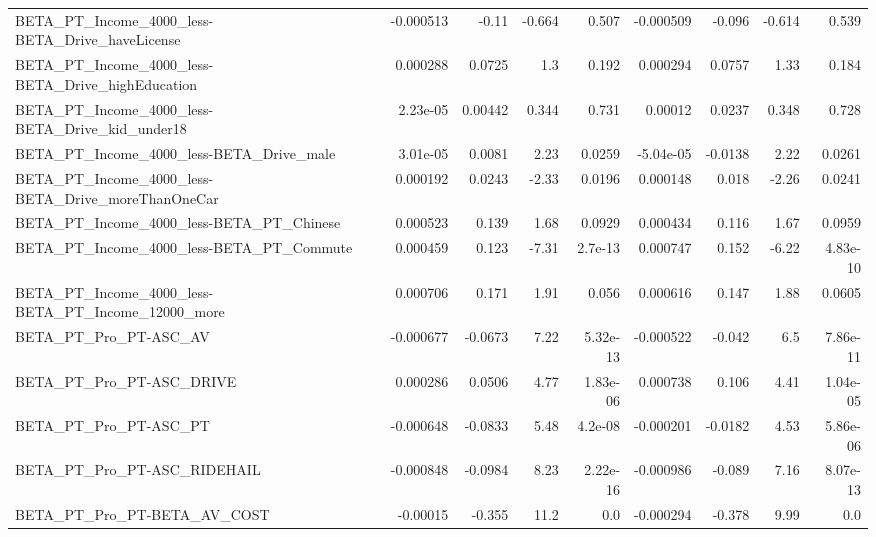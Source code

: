 \begin{tabular}{lrrrrrrrr}
BETA\_PT\_Income\_4000\_less-BETA\_Drive\_haveLicense    &   -0.000513 &        -0.11 &    -0.664 &    0.507 &  -0.000509 &      -0.096 &       -0.614 &         0.539 \\
BETA\_PT\_Income\_4000\_less-BETA\_Drive\_highEducation  &    0.000288 &       0.0725 &       1.3 &    0.192 &   0.000294 &      0.0757 &         1.33 &         0.184 \\
BETA\_PT\_Income\_4000\_less-BETA\_Drive\_kid\_under18    &    2.23e-05 &      0.00442 &     0.344 &    0.731 &    0.00012 &      0.0237 &        0.348 &         0.728 \\
BETA\_PT\_Income\_4000\_less-BETA\_Drive\_male           &    3.01e-05 &       0.0081 &      2.23 &   0.0259 &  -5.04e-05 &     -0.0138 &         2.22 &        0.0261 \\
BETA\_PT\_Income\_4000\_less-BETA\_Drive\_moreThanOneCar &    0.000192 &       0.0243 &     -2.33 &   0.0196 &   0.000148 &       0.018 &        -2.26 &        0.0241 \\
BETA\_PT\_Income\_4000\_less-BETA\_PT\_Chinese           &    0.000523 &        0.139 &      1.68 &   0.0929 &   0.000434 &       0.116 &         1.67 &        0.0959 \\
BETA\_PT\_Income\_4000\_less-BETA\_PT\_Commute           &    0.000459 &        0.123 &     -7.31 &  2.7e-13 &   0.000747 &       0.152 &        -6.22 &      4.83e-10 \\
BETA\_PT\_Income\_4000\_less-BETA\_PT\_Income\_12000\_more &    0.000706 &        0.171 &      1.91 &    0.056 &   0.000616 &       0.147 &         1.88 &        0.0605 \\
BETA\_PT\_Pro\_PT-ASC\_AV                              &   -0.000677 &      -0.0673 &      7.22 & 5.32e-13 &  -0.000522 &      -0.042 &          6.5 &      7.86e-11 \\
BETA\_PT\_Pro\_PT-ASC\_DRIVE                           &    0.000286 &       0.0506 &      4.77 & 1.83e-06 &   0.000738 &       0.106 &         4.41 &      1.04e-05 \\
BETA\_PT\_Pro\_PT-ASC\_PT                              &   -0.000648 &      -0.0833 &      5.48 &  4.2e-08 &  -0.000201 &     -0.0182 &         4.53 &      5.86e-06 \\
BETA\_PT\_Pro\_PT-ASC\_RIDEHAIL                        &   -0.000848 &      -0.0984 &      8.23 & 2.22e-16 &  -0.000986 &      -0.089 &         7.16 &      8.07e-13 \\
BETA\_PT\_Pro\_PT-BETA\_AV\_COST                        &    -0.00015 &       -0.355 &      11.2 &      0.0 &  -0.000294 &      -0.378 &         9.99 &           0.0 \\

\end{tabular}
